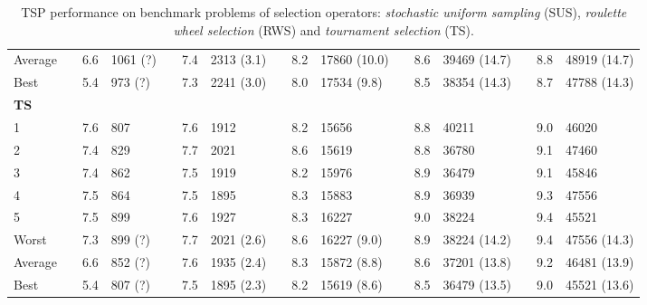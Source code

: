 \begin{sidewaystable}[hbpt]
{\begin{tabular} {l l S  l l S l l S l l S l l S l}
Average&&  6.6 & 1061 (?) && 7.4 & 2313 (3.1) && 8.2 & 17860 (10.0) && 8.6 & 39469 (14.7) && 8.8 & 48919 (14.7)    \\
Best   && 5.4 & 973 (?) && 7.3 & 2241 (3.0)  && 8.0 & 17534 (9.8)&& 8.5 & 38354 (14.3) && 8.7 & 47788 (14.3)       \\\midrule\addlinespace\addlinespace
\textbf{TS}\\
1   &&  7.6 & 807 && 7.6 & 1912  && 8.2 & 15656  && 8.8 & 40211 && 9.0 & 46020 \\
2   &&  7.4 & 829 && 7.7 & 2021  && 8.6 & 15619 && 8.8 & 36780 && 9.1 & 47460   \\
3   &&  7.4 & 862 && 7.5 & 1919 &&  8.2 & 15976 && 8.9 & 36479 && 9.1 & 45846    \\
4   &&  7.5 & 864 && 7.5& 1895  && 8.3  & 15883 && 8.9 & 36939 && 9.3 & 47556 \\
5   &&  7.5 & 899 &&  7.6 & 1927  && 8.3 & 16227 && 9.0 & 38224 && 9.4 & 45521  \\ \addlinespace
Worst  &&  7.3 & 899 (?) && 7.7 & 2021 (2.6) && 8.6 & 16227 (9.0) && 8.9 & 38224 (14.2) && 9.4 & 47556 (14.3)  \\
Average&&  6.6 & 852 (?) && 7.6 & 1935 (2.4) && 8.3 & 15872 (8.8) && 8.6 & 37201 (13.8) && 9.2 & 46481 (13.9)    \\
Best   && 5.4 & 807 (?) && 7.5 & 1895 (2.3)  && 8.2 & 15619 (8.6)&& 8.5 & 36479 (13.5) && 9.0 & 45521 (13.6)     \\
\bottomrule
\end{tabular}}
\caption[TSP performance on benchmark problems of selection operators.]{TSP performance on benchmark problems of selection operators: \emph{stochastic uniform sampling} (SUS), \emph{roulette wheel selection} (RWS) and \emph{tournament selection} (TS).}
\label{tab:sus}
\end{sidewaystable}
% 
